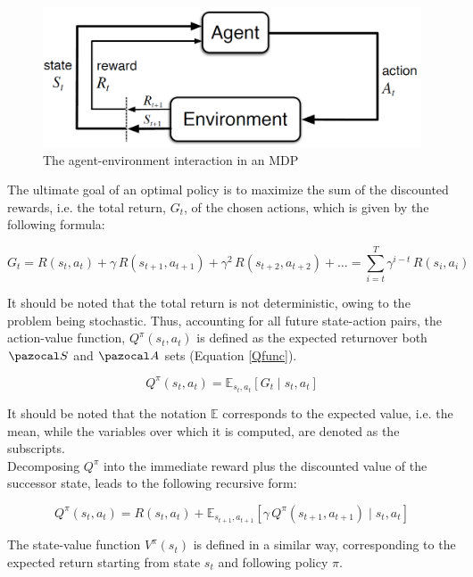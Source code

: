 \begin{figure}[H]
    \centering
	\includegraphics[width=0.65\linewidth]{Figures/RLclassicFig.png}
	\caption{The agent-environment interaction in an \gls{MDP} \cite{sutton2018reinforcement}}
	\label{RLflow}
\end{figure}


The ultimate goal of an optimal policy is to maximize the sum of the discounted rewards, i.e. the total return, $G_t$, of the chosen actions, which is given by the following formula:

\begin{equation}
    G_{t}=R(s_t, a_t)+\gamma\, R(s_{t+1}, a_{t+1})+\gamma^2\,R(s_{t+2}, a_{t+2})+\ldots= \sum_{i=t}^{T} \gamma^{i-t}\, R(s_i, a_i)  \label{expReturn}
\end{equation}

It should be noted that the total return is not deterministic, owing to the problem being stochastic. Thus, accounting for all future state-action pairs, the action-value function, $Q^{\pi}(s_t, a_t)$ is defined as the expected return\footnotemark over both $\ccal{S}$ and $\ccal{A}$ sets (Equation \ref{Qfunc}).

\begin{equation}
    Q^{\pi}(s_t, a_t) = \mathbb{E}_{s_t, a_t} \left[ G_t \mid s_t, a_t \right] \label{Qfunc} 
\end{equation}

It should be noted that the notation $\mathbb{E}$ corresponds to the expected value, i.e. the mean, while the variables over which it is computed, are denoted as the subscripts.\\

Decomposing $Q^{\pi}$ into the immediate reward plus the discounted value of the successor state, leads to the following recursive form:

\begin{equation}
    Q^{\pi}(s_t, a_t)=R(s_t, a_t) + \mathbb{E}_{s_{t+1}, a_{t+1}} \left[\gamma \, Q^{\pi}(s_{t+1},a_{t+1}) \mid s_t, a_t\right]
\end{equation}

The state-value function $V^{\pi}(s_t)$ is defined in a similar way, corresponding to the expected return starting from state $s_t$ and following policy $\pi$.

